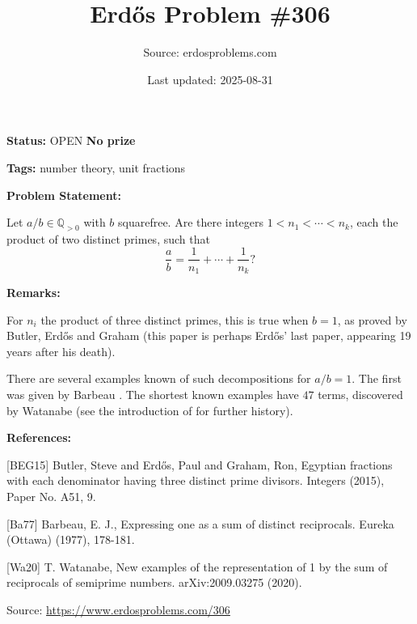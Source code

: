 \documentclass{article}
\title{Erd\H{o}s Problem \#306}
\date{Last updated: 2025-08-31}
\author{Source: erdosproblems.com}
\begin{document}
\maketitle

\noindent\textbf{Status:} OPEN \quad \textbf{No prize}

\noindent\textbf{Tags:} number theory, unit fractions

\medskip
\noindent\textbf{Problem Statement:}

Let $a/b\in \mathbb{Q}_{>0}$ with $b$ squarefree. Are there integers $1<n_1<\cdots<n_k$, each the product of two distinct primes, such that\[\frac{a}{b}=\frac{1}{n_1}+\cdots+\frac{1}{n_k}?\]

\bigskip
\noindent\textbf{Remarks:}

For $n_i$ the product of three distinct primes, this is true when $b=1$, as proved by Butler, Erd\H{o}s and Graham \cite{BEG15} (this paper is perhaps Erd\H{o}s' last paper, appearing 19 years after his death).

There are several examples known of such decompositions for $a/b=1$. The first was given by Barbeau \cite{Ba77}. The shortest known examples have $47$ terms, discovered by Watanabe \cite{Wa20} (see the introduction of \cite{Wa20} for further history).

\bigskip
\noindent\textbf{References:}

[BEG15] Butler, Steve and Erd\H{o}s, Paul and Graham, Ron, Egyptian fractions with each denominator having three distinct
prime divisors. Integers (2015), Paper No. A51, 9.
 
 [Ba77] Barbeau, E. J., Expressing one as a sum of distinct reciprocals. Eureka (Ottawa) (1977), 178-181.
 
 [Wa20] T. Watanabe, New examples of the representation of 1 by the sum of reciprocals of semiprime numbers. arXiv:2009.03275 (2020).

\bigskip
\noindent\small{Source: \url{https://www.erdosproblems.com/306}}
\end{document}
